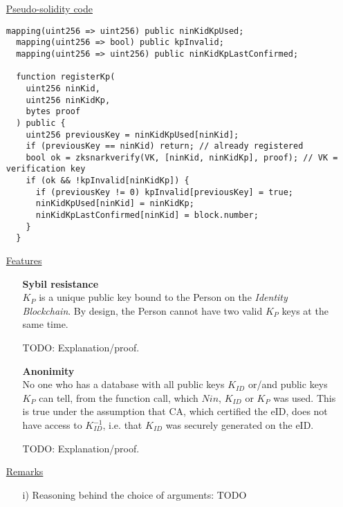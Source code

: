 \documentclass{article}
\newcommand{\khk}{K_{P}}
\newcommand{\kid}{K_{ID}}
\newcommand{\pbc}{\textit{Identity Blockchain}}
\begin{document}
\begin{enumerate}[leftmargin=0cm]
\item[] \underline{Pseudo-solidity code}

\hfill\begin{minipage}{\dimexpr\textwidth-20px}
\begin{lstlisting}[language=Solidity]
  mapping(uint256 => uint256) public ninKidKpUsed;
  mapping(uint256 => bool) public kpInvalid;
  mapping(uint256 => uint256) public ninKidKpLastConfirmed;

  function registerKp(
    uint256 ninKid,
    uint256 ninKidKp,
    bytes proof
  ) public {
    uint256 previousKey = ninKidKpUsed[ninKid];
    if (previousKey == ninKid) return; // already registered
    bool ok = zksnarkverify(VK, [ninKid, ninKidKp], proof); // VK = verification key
    if (ok && !kpInvalid[ninKidKp]) {
      if (previousKey != 0) kpInvalid[previousKey] = true;
      ninKidKpUsed[ninKid] = ninKidKp;
      ninKidKpLastConfirmed[ninKid] = block.number;
    }
  }
\end{lstlisting}
\xdef\tpd{\the\prevdepth}
\end{minipage}
\item[] \underline{Features}
\begin{itemize}
      \item[] \textbf{Sybil resistance} \\ $\khk$ is a unique public key bound to the Person on the \pbc{}. By design, the Person cannot have two valid $\khk$ keys at the same time.

      TODO: Explanation/proof.
      \vspace{5px}
    \item[] \textbf{Anonimity} \\ No one who has a database with all public keys $\kid$ or/and public keys $\khk$ can tell, from the function call, which $Nin$, $\kid$ or $\khk$ was used. This is true under the assumption that CA, which certified the eID, does not have access to $\kid^{-1}$, i.e. that $\kid$ was securely generated on the eID.

    TODO: Explanation/proof.
\end{itemize}

\item[] \underline{Remarks}
\begin{itemize}
\item[i)] Reasoning behind the choice of arguments: TODO
\end{itemize}


\end{enumerate}
\end{document}
